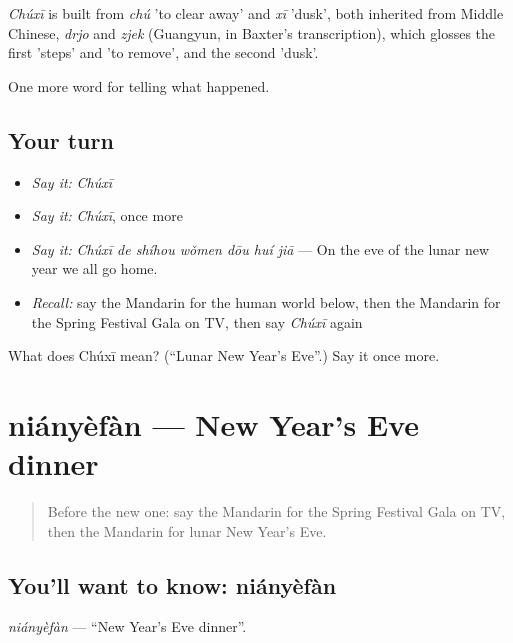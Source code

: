 \begin{cousinweb}
\emph{Chúxī} is built from \emph{chú} 'to clear away' and \emph{xī} 'dusk', both inherited from Middle Chinese, \emph{drjo} and \emph{zjek} (Guangyun, in Baxter's transcription), which glosses the first 'steps' and 'to remove', and the second 'dusk'.
\end{cousinweb}

\begin{grammarlens}[title={What you've built}]
One more word for telling what happened.
\end{grammarlens}

\subsection*{Your turn}
\begin{itemize}
\raggedright
  \item \emph{Say it:} \emph{Chúxī}
  \item \emph{Say it:} \emph{Chúxī}, once more
  \item \emph{Say it:} \emph{Chúxī de shíhou wǒmen dōu huí jiā} — On the eve of the lunar new year we all go home.
  \item \emph{Recall:} say the Mandarin for the human world below, then the Mandarin for the Spring Festival Gala on TV, then say \emph{Chúxī} again
\end{itemize}

\begin{tcolorbox}[breakable,colback=teal!4,colframe=teal!35!black,title={Before you move on}]
What does Chúxī mean? (\textquotedblleft{}Lunar New Year's Eve\textquotedblright{}.) Say it once more.
\end{tcolorbox}
\section[niányèfàn]{niányèfàn — New Year's Eve dinner}

\label{lesson:ZH-C333-nianyefan}



\begin{quote}
Before the new one: say the Mandarin for the Spring Festival Gala on TV, then the Mandarin for lunar New Year's Eve.
\end{quote}

\subsection*{You'll want to know: niányèfàn}
\emph{niányèfàn} — \textquotedblleft{}New Year's Eve dinner\textquotedblright{}.

